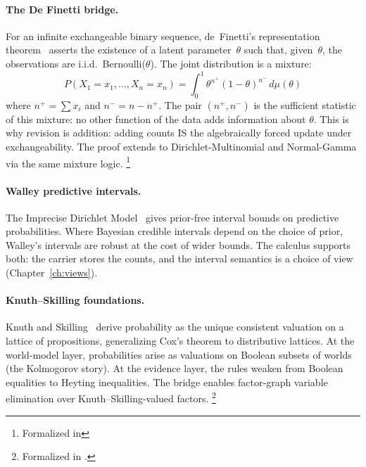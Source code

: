 \documentclass[11pt,openany]{report}
\begin{document}
\paragraph{The De Finetti bridge.}
For an infinite exchangeable binary sequence, de~Finetti's
representation theorem~\cite{definetti1937} asserts the existence of a
latent parameter~$\theta$ such that, given~$\theta$, the observations
are i.i.d.\ Bernoulli($\theta$).  The joint distribution is a mixture:
\[
  P(X_1 = x_1, \ldots, X_n = x_n)
  = \int_0^1 \theta^{n^+}(1 - \theta)^{n^-} \, d\mu(\theta)
\]
where $n^+ = \sum x_i$ and $n^- = n - n^+$.  The pair $(n^+, n^-)$
is the sufficient statistic of this mixture: no other function of
the data adds information about $\theta$.  This is why revision is
addition: adding counts IS the algebraically forced update under
exchangeability.  The proof extends to Dirichlet-Multinomial and
Normal-Gamma via the same mixture logic.%
\footnote{Formalized in
}

\paragraph{Walley predictive intervals.}
The Imprecise Dirichlet Model~\cite{Walley1996BagOfMarbles} gives
prior-free interval bounds on predictive probabilities.  Where
Bayesian credible intervals depend on the choice of prior, Walley's
intervals are robust at the cost of wider bounds.  The calculus
supports both: the carrier stores the counts, and the interval
semantics is a choice of view (Chapter~\ref{ch:views}).

\paragraph{Knuth--Skilling foundations.}
Knuth and Skilling~\cite{KnuthSkilling2012} derive probability as
the unique consistent valuation on a lattice of propositions,
generalizing Cox's theorem to distributive lattices.  At the
world-model layer, probabilities arise as valuations on Boolean
subsets of worlds (the Kolmogorov story).  At the evidence layer, the
rules weaken from Boolean equalities to Heyting inequalities.  The
bridge enables factor-graph variable elimination over
Knuth--Skilling-valued factors.%
\footnote{Formalized in
.}
\end{document}
